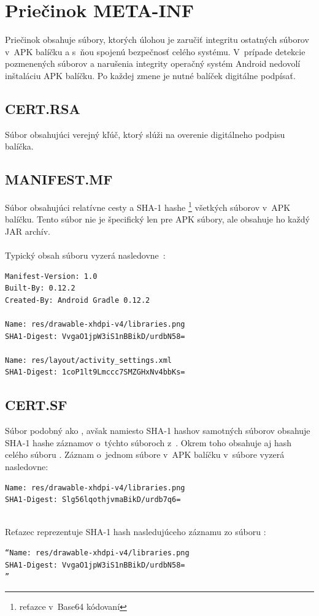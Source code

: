\section{Priečinok META-INF}
\label{META-INF}
Priečinok  obsahuje súbory, ktorých úlohou je zaručiť integritu ostatných súborov v~APK balíčku a s~ňou spojenú bezpečnosť celého systému. V~prípade detekcie pozmenených súborov a narušenia integrity operačný systém Android nedovolí inštaláciu APK balíčku. Po každej zmene je nutné balíček digitálne podpísať.

\subsection*{CERT.RSA}
\label{CERT.RSA} 
Súbor obsahujúci verejný kľúč, ktorý slúži na overenie digitálneho podpisu balíčka.
\subsection*{MANIFEST.MF}
\label{MANIFEST.MF}
Súbor obsahujúci relatívne cesty a SHA-1 hashe \footnote{reťazce v~Base64 kódovaní} všetkých súborov v~APK balíčku. Tento súbor nie je špecifický len pre APK súbory, ale obsahuje ho každý JAR archív.\\\\
Typický obsah súboru  vyzerá nasledovne~\cite{Yang2015}: \\
\begin{verbatim}
Manifest-Version: 1.0
Built-By: 0.12.2
Created-By: Android Gradle 0.12.2

Name: res/drawable-xhdpi-v4/libraries.png
SHA1-Digest: VvgaO1jpW3iS1nBBikD/urdbN58=

Name: res/layout/activity_settings.xml
SHA1-Digest: 1coP1lt9Lmccc7SMZGHxNv4bbKs=
\end{verbatim}
\subsection*{CERT.SF}
\label{CERT.SF}
Súbor podobný ako , avšak namiesto SHA-1 hashov samotných súborov obsahuje SHA-1 hashe záznamov o~týchto súboroch z~. Okrem toho obsahuje aj hash celého súboru . \newline Záznam o~jednom súbore v~APK balíčku v~súbore  vyzerá nasledovne: \newline
\begin{verbatim}
Name: res/drawable-xhdpi-v4/libraries.png
SHA1-Digest: Slg56lqothjvmaBikD/urdb7q6=
\end{verbatim}\mbox{}\\
Reťazec  reprezentuje SHA-1 hash nasledujúceho záznamu zo súboru :\mbox{}\\
\begin{verbatim}
“Name: res/drawable-xhdpi-v4/libraries.png
SHA1-Digest: VvgaO1jpW3iS1nBBikD/urdbN58=
”\end{verbatim}
